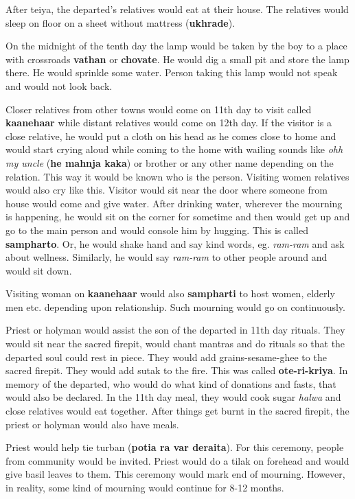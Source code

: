 After teiya, the departed's relatives would eat at their house. The relatives
would sleep on floor on a sheet without mattress (\textbf{ukhrade}).

On the midnight of the tenth day the lamp would be taken by the boy to a place
with crossroads \textbf{vathan} or \textbf{chovate}. He would dig a small pit
and store the lamp there. He would sprinkle some water. Person taking this lamp
would not speak and would not look back.

Closer relatives from other towns would come on 11th day to visit called
\textbf{kaanehaar} while distant relatives would come on 12th day. If the
visitor is a close relative, he would put a cloth on his head as he comes close
to home and would start crying aloud while coming to the home with wailing
sounds like \textit{ohh my uncle} (\textbf{he mahnja kaka}) or brother or any
other name depending on the relation. This way it would be known who is the
person. Visiting women relatives would also cry like this. Visitor would sit
near the door where someone from house would come and give water. After
drinking water, wherever the mourning is happening, he would sit on the corner
for sometime and then would get up and go to the main person and would console
him by hugging. This is called \textbf{sampharto}. Or, he would shake hand and
say kind words, eg. \textit{ram-ram} and ask about wellness. Similarly, he
would say \textit{ram-ram} to other people around and would sit down.

Visiting woman on \textbf{kaanehaar} would also \textbf{sampharti} to host
women, elderly men etc. depending upon relationship. Such mourning would go on
continuously.

Priest or holyman would assist the son of the departed in 11th day rituals.
They would sit near the sacred firepit, would chant mantras and do rituals so
that the departed soul could rest in piece. They would add grains-sesame-ghee
to the sacred firepit. They would add sutak to the fire. This was called
\textbf{ote-ri-kriya}. In memory of the departed, who would do what kind of
donations and fasts, that would also be declared. In the 11th day meal, they
would cook sugar \textit{halwa} and close relatives would eat together. After
things get burnt in the sacred firepit, the priest or holyman would also have
meals.

Priest would help tie turban (\textbf{potia ra var deraita}). For this
ceremony, people from community would be invited. Priest would do a tilak on
forehead and would give basil leaves to them. This ceremony would mark end of
mourning. However, in reality, some kind of mourning would continue for 8-12
months.

